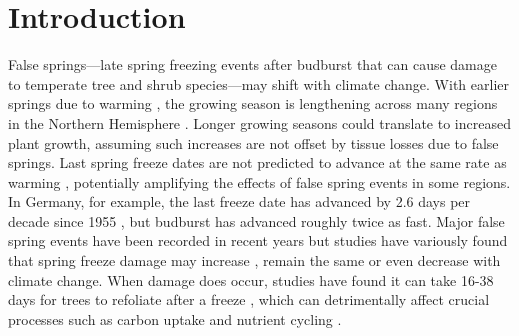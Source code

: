 \documentclass{article}\usepackage[]{graphicx}\usepackage[]{color}
\begin{document}
\section*{Introduction} %
False springs---late spring freezing events after budburst that can cause damage to temperate tree and shrub species---may shift with climate change. With earlier springs due to warming \citep{Wolkovich2012,IPCC2014}, the growing season is lengthening across many regions in the Northern Hemisphere \citep{Chen2005,Liu2006, Kukal2018}. Longer growing seasons could translate to increased plant growth, assuming such increases are not offset by tissue losses due to false springs. Last spring freeze dates are not predicted to advance at the same rate as warming \citep{Inouye2008,Martin2010,Labe2016,Wypych2016a,Sgubin2018}, potentially amplifying the effects of false spring events in some regions. In Germany, for example, the last freeze date has advanced by 2.6 days per decade since 1955 \citep{Zohner2016}, but budburst has advanced roughly twice as fast. Major false spring events have been recorded in recent years but studies have variously found that spring freeze damage may increase \citep{Hannenin1991,Augspurger2013,Labe2016}, remain the same \citep{Scheifinger2003} or even decrease \citep{Kramer1994, Vitra2017} with climate change. When damage does occur, studies have found it can take 16-38 days for trees to refoliate after a freeze \citep{Gu2008,Augspurger2009, Augspurger2013, Menzel2015}, which can detrimentally affect crucial processes such as carbon uptake and nutrient cycling \citep{Hufkens2012,Richardson2013,Klosterman2018}.  
\end{document}

